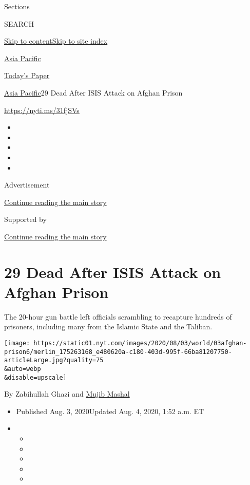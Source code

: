 Sections

SEARCH

\protect\hyperlink{site-content}{Skip to
content}\protect\hyperlink{site-index}{Skip to site index}

\href{https://www.nytimes.com/section/world/asia}{Asia Pacific}

\href{https://myaccount.nytimes.com/auth/login?response_type=cookie\&client_id=vi}{}

\href{https://www.nytimes.com/section/todayspaper}{Today's Paper}

\href{/section/world/asia}{Asia Pacific}\textbar{}29 Dead After ISIS
Attack on Afghan Prison

\url{https://nyti.ms/31fjSVs}

\begin{itemize}
\item
\item
\item
\item
\item
\end{itemize}

Advertisement

\protect\hyperlink{after-top}{Continue reading the main story}

Supported by

\protect\hyperlink{after-sponsor}{Continue reading the main story}

\hypertarget{29-dead-after-isis-attack-on-afghan-prison}{%
\section{29 Dead After ISIS Attack on Afghan
Prison}\label{29-dead-after-isis-attack-on-afghan-prison}}

The 20-hour gun battle left officials scrambling to recapture hundreds
of prisoners, including many from the Islamic State and the Taliban.

\texttt{[image: https://static01.nyt.com/images/2020/08/03/world/03afghan-prison6/merlin\_175263168\_e480620a-c180-403d-995f-66ba81207750-articleLarge.jpg?quality=75\\\&auto=webp\\\&disable=upscale]}

By Zabihullah Ghazi and
\href{https://www.nytimes.com/by/mujib-mashal}{Mujib Mashal}

\begin{itemize}
\item
  Published Aug. 3, 2020Updated Aug. 4, 2020, 1:52 a.m. ET
\item
  \begin{itemize}
  \item
  \item
  \item
  \item
  \item
  \end{itemize}
\end{itemize}

